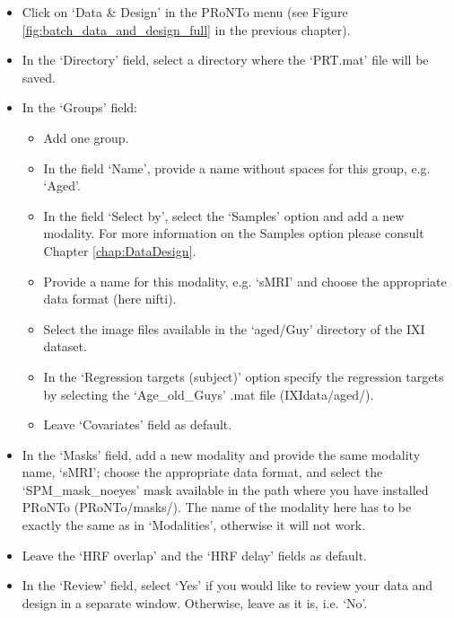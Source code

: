 \begin{itemize}

    \item Click on `Data \& Design' in the PRoNTo menu (see Figure \ref{fig:batch_data_and_design_full} in the previous chapter).
    
    \item In the `Directory' field, select a directory where the `PRT.mat' file will be saved.
    
    \item In the `Groups' field:
 	
		\begin{itemize}
		
		\item Add one group.
		
		\item In the field `Name', provide a name without spaces for this group, e.g. `Aged'.

    	\item In the field `Select by', select the `Samples' option and add a new modality. For more information on the Samples option please consult Chapter \ref{chap:DataDesign}.
        	
    	\item Provide a name for this modality, e.g. `sMRI' and choose the appropriate data format (here nifti).
    	
    	\item Select the image files available in the `aged/Guy' directory of the IXI dataset.
    	
    	\item In the `Regression targets (subject)' option specify the regression targets by selecting the `Age\_old\_Guys' .mat file (IXIdata/aged/).
    	
    	\item Leave `Covariates' field as default.

\end{itemize}    

		\item In the `Masks' field, add a new modality and provide the same modality name, `sMRI'; choose the appropriate data format, and select the `SPM\_mask\_noeyes' mask available in the path where you have installed PRoNTo (PRoNTo/masks/). The name of the modality here has to be exactly the same as in `Modalities', otherwise it will not work.
		
    \item Leave the `HRF overlap' and the `HRF delay' fields as default.
	
	\item In the `Review' field, select `Yes' if you would like to review your data and design in a separate window. Otherwise, leave as it is, i.e. `No'.
        
\end{itemize}

